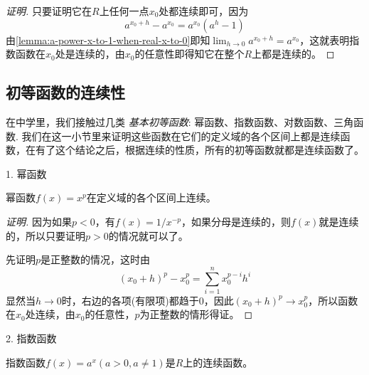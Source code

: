 \begin{proof}[证明]
  只要证明它在$R$上任何一点$x_0$处都连续即可，因为
  \[ a^{x_0+h} - a^{x_0} = a^{x_0}(a^h-1) \]
  由\autoref{lemma:a-power-x-to-1-when-real-x-to-0}即知$\lim_{h \to 0} a^{x_0+h} = a^{x_0}$，这就表明指数函数在$x_0$处是连续的，由$x_0$的任意性即得知它在整个$R$上都是连续的。
\end{proof}

\subsection{初等函数的连续性}
\label{sec:the-continuity-of-elementary-function}

在中学里，我们接触过几类 \emph{基本初等函数}: 幂函数、指数函数、对数函数、三角函数. 我们在这一小节里来证明这些函数在它们的定义域的各个区间上都是连续函数，在有了这个结论之后，根据连续的性质，所有的初等函数就都是连续函数了。

1. 幂函数
\begin{theorem}
  幂函数$f(x)=x^p$在定义域的各个区间上连续。
\end{theorem}

\begin{proof}[证明]
  因为如果$p<0$，有$f(x)=1/x^{-p}$，如果分母是连续的，则$f(x)$就是连续的，所以只要证明$p>0$的情况就可以了。

  先证明$p$是正整数的情况，这时由
  \[ (x_0+h)^p-x_0^p = \sum_{i=1}^nx_0^{p-i}h^i \]
  显然当$h \to 0$时，右边的各项(有限项)都趋于0，因此$(x_0+h)^p \to x_0^p$，所以函数在$x_0$处连续，由$x_0$的任意性，$p$为正整数的情形得证。
\end{proof}

2. 指数函数
\begin{theorem}
  指数函数$f(x)=a^x(a>0,a\neq 1)$是$R$上的连续函数。
\end{theorem}



